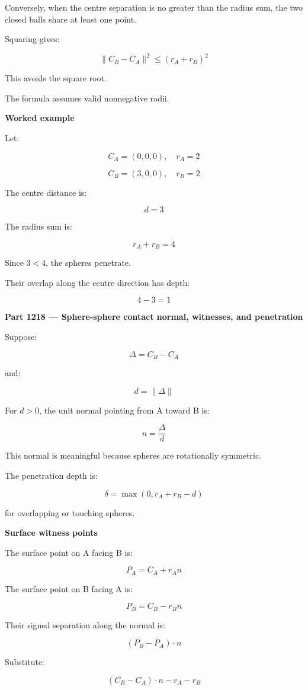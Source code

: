 Conversely, when the centre separation is no greater than the radius sum, the two closed balls share at least one point.

Squaring gives:

\[
\boxed{ \|C_B-C_A\|^2\le(r_A+r_B)^2 }
\]

This avoids the square root.

The formula assumes valid nonnegative radii.

\textbf{Worked example}

Let:

\[
C_A=(0,0,0),\quad r_A=2
\]

\[
C_B=(3,0,0),\quad r_B=2
\]

The centre distance is:

\[
d=3
\]

The radius sum is:

\[
r_A+r_B=4
\]

Since \(3<4\), the spheres penetrate.

Their overlap along the centre direction has depth:

\[
4-3=1
\]

\textbf{Part 1218 --- Sphere-sphere contact normal, witnesses, and penetration}

Suppose:

\[
\Delta=C_B-C_A
\]

and:

\[
d=\|\Delta\|
\]

For \(d>0\), the unit normal pointing from A toward B is:

\[
\boxed{ n=\frac{\Delta}{d} }
\]

This normal is meaningful because spheres are rotationally symmetric.

The penetration depth is:

\[
\boxed{ \delta=\max(0,r_A+r_B-d) }
\]

for overlapping or touching spheres.

\textbf{Surface witness points}

The surface point on A facing B is:

\[
\boxed{ P_A=C_A+r_An }
\]

The surface point on B facing A is:

\[
\boxed{ P_B=C_B-r_Bn }
\]

Their signed separation along the normal is:

\[
(P_B-P_A)\cdot n
\]

Substitute:

\[
(C_B-C_A)\cdot n-r_A-r_B
\]


